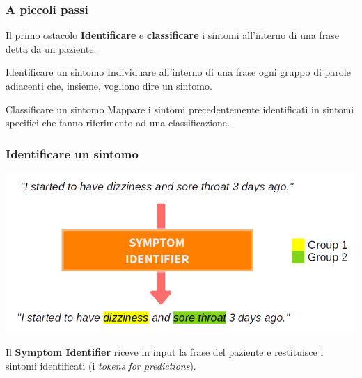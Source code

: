 \documentclass{beamer}
\begin{document}
\begin{frame}
\frametitle{A piccoli passi}

\begin{block}{Il primo ostacolo}
\textbf{Identificare} e \textbf{classificare} i sintomi all'interno di una frase detta da un paziente.
\end{block} \pause

\begin{exampleblock}{Identificare un sintomo}
Individuare all'interno di una frase ogni gruppo di parole adiacenti che, insieme, vogliono dire un sintomo.
\end{exampleblock}\pause

\begin{exampleblock}{Classificare un sintomo}
Mappare i sintomi precedentemente identificati in sintomi specifici che fanno riferimento ad una classificazione.
\end{exampleblock}

\end{frame}

\begin{frame}
\frametitle{Identificare un sintomo}

\includegraphics[width=\textwidth]{images/symptom_identifier.png}

Il \textbf{Symptom Identifier} riceve in input la frase del paziente e restituisce i sintomi identificati (i \emph{tokens for predictions}).

\end{frame}
\end{document}
